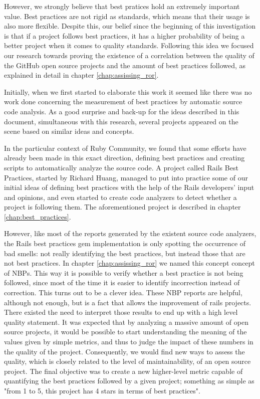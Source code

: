 However, we strongly believe that best pratices hold an extremely important value.
Best practices are not rigid as standards, which means that their usage is also more flexible.
Despite this, our belief since the beginning of this investigation is that if 
a project follows best practices, it has a higher probability of being a better project when it comes to quality standards.
Following this idea we focused our research towards proving the existence of
a correlation between the quality of the GitHub open source projects and the amount of best practices followed,
as explained in detail in chapter \ref{chap:assissing_ror}.

Initially, when we first started to elaborate this work it seemed like there was no work done 
concerning the measurement of best practices by automatic source code analysis.
As a good surprise and back-up for the ideas described in this document, simultaneous with this research, 
several projects appeared on the scene based on similar ideas and concepts.

In the particular context of Ruby Community, we found that some efforts have already been made in this exact direction,
defining best practices and creating scripts to automatically analyze the source code.
A project called Rails Best Practices, started by Richard Huang, managed to put into practice some of our initial ideas of defining best practices with 
the help of the Rails developers' input and opinions, and even started to create code analyzers to detect whether a project is following them.
The aforementioned project is described in chapter \ref{chap:best_practices}.

However, like most of the reports generated by the existent source code analyzers,
the Rails best practices gem implementation is only spotting the occurrence of bad smells:
not really identifying the best practices, but instead those that are not best practices. 
In chapter \ref{chap:assissing_ror} we named this concept concept of NBPs.
This way it is possible to verify whether a best practice is not being followed, 
since most of the time it is easier to identify incorrection instead of correction.
This turns out to be a clever idea.
These NBP reports are helpful, although not enough, but is a fact that allows the improvement of rails projects.
There existed the need to interpret those results to end up with a high level quality statement.
It was expected that by analyzing a massive amount of open source projects, it would be possible to start understanding
the meaning of the values given by simple metrics,
and thus to judge the impact of these numbers in the quality of the project. 
Consequently, we would find new ways to assess the quality, which is closely related to the level of maintainability, of an open source project.
The final objective was to create a new higher-level metric capable of quantifying the best practices followed by a given project; something as simple as "from 1 to 5, this project has 4 stars in terms of best practices".

